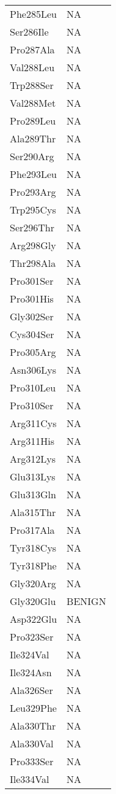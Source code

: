 \begin{longtable}[l]{l|l}
	Phe285Leu & NA \\
	Ser286Ile & NA \\
	Pro287Ala & NA \\
	Val288Leu & NA \\
	Trp288Ser & NA \\
	Val288Met & NA \\
	Pro289Leu & NA \\
	Ala289Thr & NA \\
	Ser290Arg & NA \\
	Phe293Leu & NA \\
	Pro293Arg & NA \\
	Trp295Cys & NA \\
	Ser296Thr & NA \\
	Arg298Gly & NA \\
	Thr298Ala & NA \\
	Pro301Ser & NA \\
	Pro301His & NA \\
	Gly302Ser & NA \\
	Cys304Ser & NA \\
	Pro305Arg & NA \\
	Asn306Lys & NA \\
	Pro310Leu & NA \\
	Pro310Ser & NA \\
	Arg311Cys & NA \\
	Arg311His & NA \\
	Arg312Lys & NA \\
	Glu313Lys & NA \\
	Glu313Gln & NA \\
	Ala315Thr & NA \\
	Pro317Ala & NA \\
	Tyr318Cys & NA \\
	Tyr318Phe & NA \\
	Gly320Arg & NA \\
	Gly320Glu & BENIGN \\
	Asp322Glu & NA \\
	Pro323Ser & NA \\
	Ile324Val & NA \\
	Ile324Asn & NA \\
	Ala326Ser & NA \\
	Leu329Phe & NA \\
	Ala330Thr & NA \\
	Ala330Val & NA \\
	Pro333Ser & NA \\
	Ile334Val & NA \\

\end{longtable}
